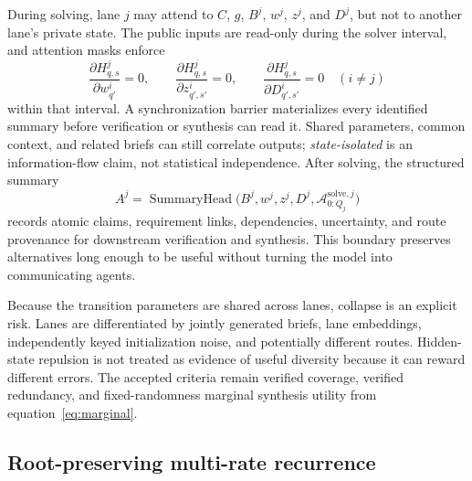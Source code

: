 \documentclass[10pt,a4paper]{article}
\newcommand{\op}[1]{\operatorname{#1}}
\newcommand{\Acal}{\mathcal{A}}
\begin{document}
During solving, lane $j$ may attend to $C$, $g$, $B^j$, $w^j$, $z^j$, and
$D^j$, but not to another lane's private state. The public inputs are
read-only during the solver interval, and attention masks enforce
\begin{equation}
\frac{\partial H^j_{q,s}}{\partial w^i_{q'}} = 0,
\qquad
\frac{\partial H^j_{q,s}}{\partial z^i_{q',s'}} = 0,
\qquad
\frac{\partial H^j_{q,s}}{\partial D^i_{q',s'}} = 0
\quad (i \ne j)
\end{equation}
within that interval. A synchronization barrier materializes every identified
summary before verification or synthesis can read it. Shared parameters,
common context, and related briefs can still correlate outputs;
\emph{state-isolated} is an information-flow claim, not statistical
independence. After solving, the structured summary
\begin{equation}
A^j = \op{SummaryHead}\bigl( B^j, w^j, z^j, D^j, \Acal^{\mathrm{solve},j}_{0:Q_j} \bigr)
\end{equation}
records atomic claims, requirement links, dependencies, uncertainty, and route
provenance for downstream verification and synthesis. This boundary preserves
alternatives long enough to be useful without turning the model into
communicating agents.

Because the transition parameters are shared across lanes, collapse is an
explicit risk. Lanes are differentiated by jointly generated briefs, lane
embeddings, independently keyed initialization noise, and potentially
different routes. Hidden-state repulsion is not treated as evidence of useful
diversity because it can reward different errors. The accepted criteria remain
verified coverage, verified redundancy, and fixed-randomness marginal
synthesis utility from equation~\eqref{eq:marginal}.

\subsection{Root-preserving multi-rate recurrence}
\label{sec:recurrence}
\end{document}

